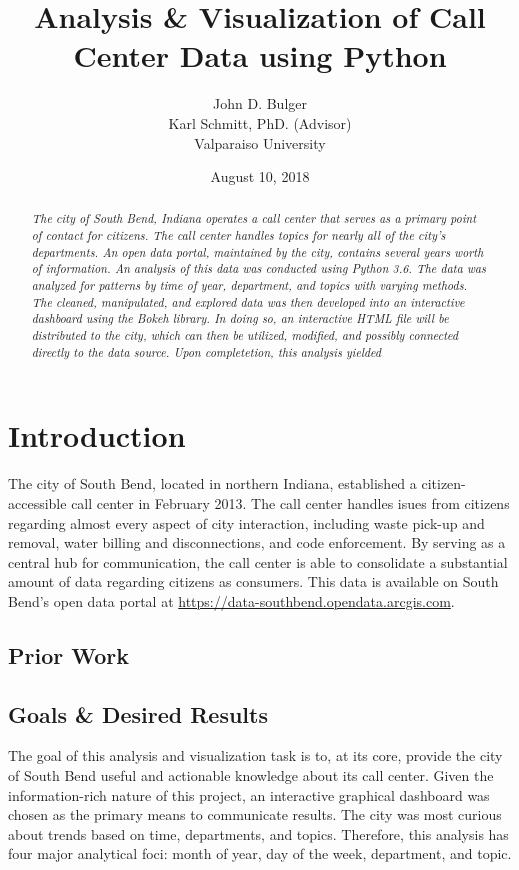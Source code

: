 \documentclass{article}
\title{Analysis \& Visualization of Call Center Data using Python}
\author{John D. Bulger
\\
Karl Schmitt, PhD. (Advisor)
\\
Valparaiso University\\
}
\date{August 10, 2018}
\begin{document}
\maketitle

\begin{abstract}
\textit{The city of South Bend, Indiana operates a call center that serves as a primary point of contact for citizens.  The call center handles topics for nearly all of the city's departments.  An open data portal, maintained by the city, contains several years worth of information.  An analysis of this data was conducted using Python 3.6.  The data was 
analyzed for patterns by time of year, department, and topics with varying methods.  The cleaned, manipulated, and explored data was then developed into an 
interactive dashboard using the Bokeh library.  In doing so, an interactive HTML file will be distributed to the city, which can then be utilized, modified, and possibly connected 
directly to the data source.  Upon completetion, this analysis yielded} %
\end{abstract}

\section{Introduction}
The city of South Bend, located in northern Indiana, established a citizen-accessible call center in February 2013.  The call center handles isues from citizens regarding almost every aspect of city interaction, including waste pick-up and removal, water billing and disconnections, 
and code enforcement.  By serving as a central hub for communication, the call center is able to consolidate a substantial amount of data regarding citizens as consumers.  This data is available on South Bend's open data portal at \href{https://data-southbend.opendata.arcgis.com}{https://data-southbend.opendata.arcgis.com}.

	\subsection{Prior Work}




	\subsection{Goals \& Desired Results}

The goal of this analysis and visualization task is to, at its core, provide the city of South Bend useful and actionable knowledge about its call center.  Given the information-rich nature of this project, an interactive graphical dashboard was chosen as the primary means to communicate results.  The city was most curious about trends based on time, departments, and topics.  Therefore, this analysis has four major analytical foci:  month of year, day of the week, department, and topic.  
\end{document}

